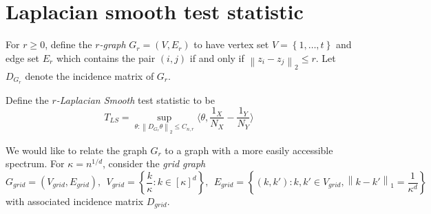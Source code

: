 \documentclass{article}
\newcommand{\norm}[1]{\left\lVert#1\right\rVert}
\newcommand{\set}[1]{\left\{#1\right\}}
\newcommand{\dotp}[2]{\langle #1, #2 \rangle}
\newcommand{\1}{\mathbb{I}}
\theoremstyle{alden}
\theoremstyle{aldenthm}
\theoremstyle{definition}
\theoremstyle{remark}
\begin{document}
\section{Laplacian smooth test statistic}

For $r \geq 0$, define the \emph{$r$-graph} $G_r = (V,E_r)$ to have vertex set $V = \set{1,\ldots,t}$ and edge set $E_r$ which contains the pair $(i,j)$ if and only if $\norm{z_i - z_j}_2 \leq r$. Let $D_{G_r}$ denote the incidence matrix of $G_r$. 

Define the \emph{$r$-Laplacian Smooth} test statistic to be
\begin{equation*}
T_{LS} = \sup_{\theta: \norm{D_{G_r}\theta}_2 \leq C_{n,r}} \dotp{\theta}{\frac{1_X}{N_X} - \frac{1_Y}{N_Y}}
\end{equation*}

We would like to relate the graph $G_r$ to a graph with a more easily accessible spectrum. For $\kappa = n^{1/d}$, consider the \emph{grid graph}
\begin{equation*}
G_{grid} = (V_{grid},E_{grid}),~~ V_{grid} = \set{\frac{k}{\kappa}: k \in [\kappa]^d},~~ E_{grid} = \set{(k,k'): k, k' \in V_{grid}, \norm{k - k'}_1 = \frac{1}{\kappa^d}}
\end{equation*}
with associated incidence matrix $D_{grid}$.
\end{document}
